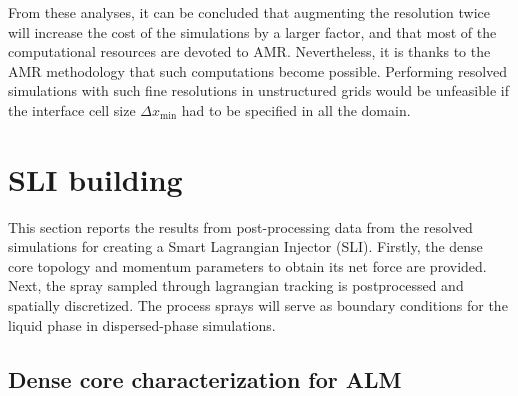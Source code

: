 From these analyses, it can be concluded that  augmenting the resolution twice will increase the cost of the simulations by a larger factor, and that most of the computational resources are devoted to AMR. Nevertheless, it is thanks to the AMR methodology that such computations become possible. Performing resolved simulations with such fine resolutions in unstructured grids would be unfeasible if the interface cell size $\Delta x_\mathrm{min}$ had to be specified in all the domain.



\clearpage

\section{SLI building}
\label{sec:ch5_SLI_building}

This section reports the results from post-processing data from the resolved simulations for creating a Smart Lagrangian Injector (SLI). Firstly, the dense core topology and momentum parameters to obtain its net force are provided. Next, the spray sampled through lagrangian tracking is postprocessed and spatially discretized. The process sprays will serve as boundary conditions for the liquid phase in dispersed-phase simulations.

\vspace*{-0.1in}

\subsection{Dense core characterization for ALM}
\label{subsec:ch5_DC_topology_characterization}




